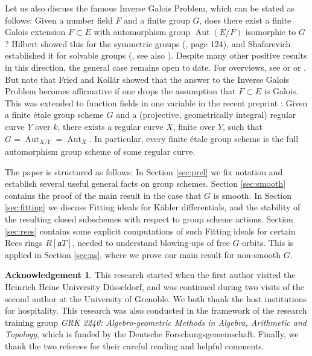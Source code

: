 \documentclass[oneside, 12pt]{amsart}
\theoremstyle{definition}
\newtheorem*{acknowledgement}{Acknowledgement}
\theoremstyle{remark}
\newcommand{\ideala}{\mathfrak{a}}
\newcommand{\Aut}{\operatorname{Aut}}
\begin{document}
Let us also discuss the famous Inverse Galois Problem, which can  be stated as follows:
Given a  number field $F$ and a finite group $G$, does there exist 
a finite Galois extension $F\subset E$ with automorphism group 
$\Aut(E/F)$ isomorphic to $G$? Hilbert showed this 
for the symmetric groups (\cite{Hilbert 1892}, page 124), and
Shafarevich established it for solvable groups 
(\cite{Safarevic 1954}, see also \cite{Neukirch; Schmidt; Wingberg 2008}). 
Despite many other positive results in this direction,  the general case remains open to date.
For overviews, see \cite{Serre 1992} or \cite{Voelklein 1996} or  \cite{Malle; Matzat 1999}. 
But note that  Fried and Koll\'ar \cite{Fried;  Kollar 1978} showed that the answer to the Inverse 
Galois Problem becomes affirmative if one drops the assumption that 
$F\subset E$ is Galois. This was extended to function fields in one variable 
in the recent preprint \cite{Bragg 2023}:  Given a finite \'etale group scheme $G$
and a (projective,  geometrically integral) regular curve $Y$ over $k$, 
there exists a regular curve $X$,  finite over $Y$,  such that $G = \Aut_{X/Y} = \Aut_X$.
In particular,  every finite \'etale group scheme is the full automorphism group scheme
of some regular curve.

\medskip
The paper is structured as follows:
In Section \ref{sec:prel} we fix notation and establish several useful general facts on group schemes.
Section \ref{sec:smooth} contains the proof of the main result in the case that $G$ is smooth.
In Section \ref{sec:fitting} we discuss Fitting ideals for K\"ahler differentials, and the stability of the resulting
closed subschemes with respect to group scheme actions.
Section \ref{sec:rees} contains some explicit computations of such Fitting ideals for certain Rees rings $R[\ideala T]$,
needed to understand blowing-ups of free $G$-orbits.
This is applied in Section \ref{sec:ns}, where we prove our main result for non-smooth $G$.


\begin{acknowledgement}
This research started when the first author visited the Heinrich Heine University D\"usseldorf,
and was continued during two visits of the second author at the University of Grenoble.
We both thank the host institutions for hospitality.
This research was also conducted in the framework of the   research training group
\emph{GRK 2240: Algebro-geometric Methods in Algebra, Arithmetic and Topology}, which is funded
by the Deutsche Forschungsgemeinschaft. 
Finally,  we thank the two referees for their careful reading
and helpful comments.
\end{acknowledgement}
\end{document}
